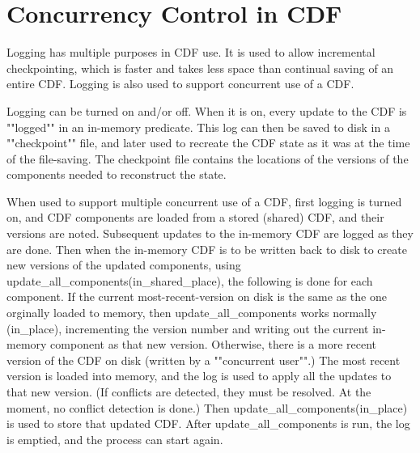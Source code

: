 \section{Concurrency Control in CDF} \label{sec:concurrency}

Logging has multiple purposes in CDF use.  It is used to allow
incremental checkpointing, which is faster and takes less space than
continual saving of an entire CDF.  Logging is also used to support
concurrent use of a CDF.

Logging can be turned on and/or off.  When it is on, every update to
the CDF is ""logged"" in an in-memory predicate.  This log can then be
saved to disk in a ""checkpoint"" file, and later used to recreate the
CDF state as it was at the time of the file-saving.  The checkpoint
file contains the locations of the versions of the components needed
to reconstruct the state.

When used to support multiple concurrent use of a CDF, first logging
is turned on, and CDF components are loaded from a stored (shared)
CDF, and their versions are noted.  Subsequent updates to the
in-memory CDF are logged as they are done.  Then when the in-memory
CDF is to be written back to disk to create new versions of the
updated components, using update\_all\_components(in\_shared\_place), the
following is done for each component.  If the current
most-recent-version on disk is the same as the one orginally loaded to
memory, then update\_all\_components works normally (in\_place),
incrementing the version number and writing out the current in-memory
component as that new version.  Otherwise, there is a more recent
version of the CDF on disk (written by a ""concurrent user"".)  The most
recent version is loaded into memory, and the log is used to apply all
the updates to that new version.  (If conflicts are detected, they
must be resolved.  At the moment, no conflict detection is done.)
Then update\_all\_components(in\_place) is used to store that updated
CDF.  After update\_all\_components is run, the log is emptied, and the
process can start again.  

